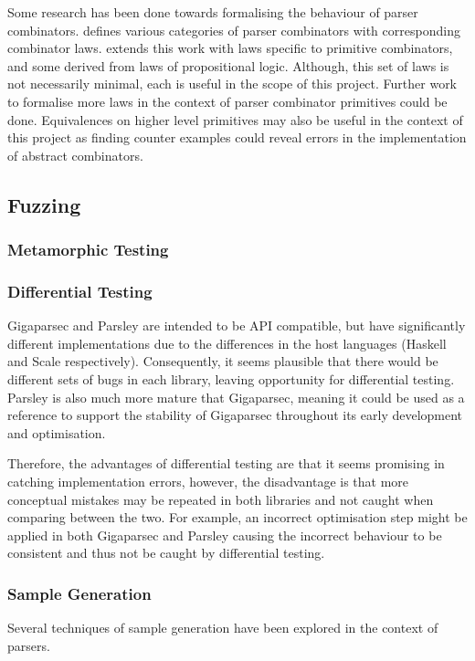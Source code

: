 \documentclass[11pt]{article}
\let\oldciteauthor\citeauthor
\renewcommand{\citeauthor}[1]{\oldciteauthor{#1} \cite{#1}}
\begin{document}
Some research has been done towards formalising the behaviour of parser combinators. \citeauthor{parsley} defines various categories of parser combinators with corresponding combinator laws. \citeauthor{staged-selective} extends this work with laws specific to primitive combinators, and some derived from laws of propositional logic. Although, this set of laws is not necessarily minimal, each is useful in the scope of this project. Further work to formalise more laws in the context of parser combinator primitives could be done. Equivalences on higher level primitives may also be useful in the context of this project as finding counter examples could reveal errors in the implementation of abstract combinators.

\subsection{Fuzzing}
\subsubsection{Metamorphic Testing}

\subsubsection{Differential Testing}
Gigaparsec and Parsley are intended to be API compatible, but have significantly different implementations due to the differences in the host languages (Haskell and Scale respectively). Consequently, it seems plausible that there would be different sets of bugs in each library, leaving opportunity for differential testing. Parsley is also much more mature that Gigaparsec, meaning it could be used as a reference to support the stability of Gigaparsec throughout its early development and optimisation.

Therefore, the advantages of differential testing are that it seems promising in catching implementation errors, however, the disadvantage is that more conceptual mistakes may be repeated in both libraries and not caught when comparing between the two. For example, an incorrect optimisation step might be applied in both Gigaparsec and Parsley causing the incorrect behaviour to be consistent and thus not be caught by differential testing.

\subsubsection{Sample Generation}
Several techniques of sample generation have been explored in the context of parsers. 
\end{document}
